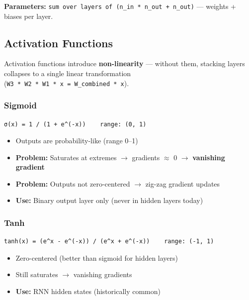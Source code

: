 \documentclass[11pt]{article}
\providecommand{\tightlist}{\setlength{\itemsep}{1pt}\setlength{\parskip}{0pt}}
\begin{document}
\textbf{Parameters:} \texttt{sum\ over\ layers\ of\ (n\_in\ *\ n\_out\ +\ n\_out)} --- weights + biases per layer.

\subsection{Activation Functions}\label{activation-functions}


Activation functions introduce \textbf{non-linearity} --- without them, stacking layers collapses to a single linear transformation (\texttt{W3\ *\ W2\ *\ W1\ *\ x\ =\ W\_combined\ *\ x}).

\subsubsection{Sigmoid}\label{sigmoid}

\setcodelang{}

\begin{verbatim}
σ(x) = 1 / (1 + e^(-x))    range: (0, 1)
\end{verbatim}

\begin{itemize}
\tightlist
\item
  Outputs are probability-like (range 0--1)
\item
  \textbf{Problem:} Saturates at extremes \(\rightarrow\) gradients \(\approx\) 0 \(\rightarrow\) \textbf{vanishing gradient}
\item
  \textbf{Problem:} Outputs not zero-centered \(\rightarrow\) zig-zag gradient updates
\item
  \textbf{Use:} Binary output layer only (never in hidden layers today)
\end{itemize}

\subsubsection{Tanh}\label{tanh}

\setcodelang{}

\begin{verbatim}
tanh(x) = (e^x - e^(-x)) / (e^x + e^(-x))    range: (-1, 1)
\end{verbatim}

\begin{itemize}
\tightlist
\item
  Zero-centered (better than sigmoid for hidden layers)
\item
  Still saturates \(\rightarrow\) vanishing gradients
\item
  \textbf{Use:} RNN hidden states (historically common)
\end{itemize}
\end{document}

